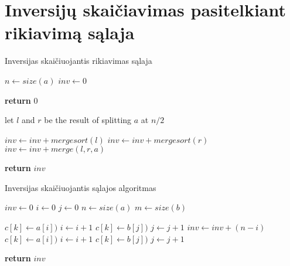 \documentclass{VUMIFInfKursinis}
\begin{document}
\printbibliography[heading=bibintoc] %

\appendix  %

\section{Inversijų skaičiavimas pasitelkiant rikiavimą sąlaja}

\begin{algorithm}[H]
  \caption{Inversijas skaičiuojantis rikiavimas sąlaja}\label{alg:merge_sort}
  \begin{algorithmic}[1]
      \State $n \gets size(a)$
      \State $inv \gets 0$
      
        \State \textbf{return} $0$ 
      \EndIf

      \State let $l$ and $r$ be the result of splitting $a$ at $n/2$

      \State $inv \gets inv + mergesort(l)$
      \State $inv \gets inv + mergesort(r)$
      \State $inv \gets inv + merge(l,r,a)$

      \State \textbf{return} $inv$ 

    \EndProcedure
  \end{algorithmic}
\end{algorithm}

\begin{algorithm}[H]
  \caption{Inversijas skaičiuojantis sąlajos algoritmas}\label{alg:merge}
  \begin{algorithmic}[1]
      \State $inv \gets 0$
      \State $i \gets 0$
      \State $j \gets 0$
      \State $n \gets size(a)$
      \State $m \gets size(b)$
      
              \State $c[k] \gets a[i])$
              \State $i \gets i+1$
            \Else
              \State $c[k] \gets b[j])$
              \State $j \gets j+1$
              \State $inv \gets inv + (n-i)$
            \EndIf
          \Else
            \State $c[k] \gets a[i])$
            \State $i \gets i+1$
          \EndIf
        \Else
          \State $c[k] \gets b[j])$
          \State $j \gets j+1$
        \EndIf
      \EndFor

      \State \textbf{return} $inv$
      
    \EndProcedure
  \end{algorithmic}
\end{algorithm}
\end{document}
